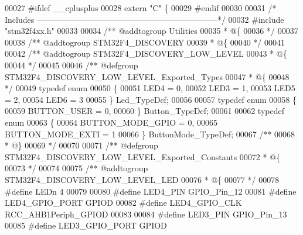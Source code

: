 \begin{DoxyCode}
00027 \textcolor{preprocessor}{#}\textcolor{preprocessor}{ifdef} \_\_cplusplus
00028  \textcolor{keyword}{extern} \textcolor{stringliteral}{"C"} \{
00029 \textcolor{preprocessor}{#}\textcolor{preprocessor}{endif}
00030 
00031 \textcolor{comment}{/* Includes ------------------------------------------------------------------*/}
00032  \textcolor{preprocessor}{#}\textcolor{preprocessor}{include} "stm32f4xx.h"
00033 
00034 \textcolor{comment}{/** @addtogroup Utilities}
00035 \textcolor{comment}{  * @\{}
00036 \textcolor{comment}{  */}
00037 
00038 \textcolor{comment}{/** @addtogroup STM32F4\_DISCOVERY}
00039 \textcolor{comment}{  * @\{}
00040 \textcolor{comment}{  */}
00041 
00042 \textcolor{comment}{/** @addtogroup STM32F4\_DISCOVERY\_LOW\_LEVEL}
00043 \textcolor{comment}{  * @\{}
00044 \textcolor{comment}{  */}
00045 
00046 \textcolor{comment}{/** @defgroup STM32F4\_DISCOVERY\_LOW\_LEVEL\_Exported\_Types}
00047 \textcolor{comment}{  * @\{}
00048 \textcolor{comment}{  */}
00049 \textcolor{keyword}{typedef} \textcolor{keyword}{enum}
00050 \{
00051   LED4 = 0,
00052   LED3 = 1,
00053   LED5 = 2,
00054   LED6 = 3
00055 \} Led\_TypeDef;
00056 
00057 \textcolor{keyword}{typedef} \textcolor{keyword}{enum}
00058 \{
00059   BUTTON_USER = 0,
00060 \} Button\_TypeDef;
00061 
00062 \textcolor{keyword}{typedef} \textcolor{keyword}{enum}
00063 \{
00064   BUTTON_MODE_GPIO = 0,
00065   BUTTON_MODE_EXTI = 1
00066 \} ButtonMode\_TypeDef;
00067 \textcolor{comment}{/**}
00068 \textcolor{comment}{  * @\}}
00069 \textcolor{comment}{  */}
00070 
00071 \textcolor{comment}{/** @defgroup STM32F4\_DISCOVERY\_LOW\_LEVEL\_Exported\_Constants}
00072 \textcolor{comment}{  * @\{}
00073 \textcolor{comment}{  */}
00074 
00075 \textcolor{comment}{/** @addtogroup STM32F4\_DISCOVERY\_LOW\_LEVEL\_LED}
00076 \textcolor{comment}{  * @\{}
00077 \textcolor{comment}{  */}
00078 \textcolor{preprocessor}{#}\textcolor{preprocessor}{define} \textcolor{preprocessor}{LEDn}                             4
00079 
00080 \textcolor{preprocessor}{#}\textcolor{preprocessor}{define} \textcolor{preprocessor}{LED4\_PIN}                         GPIO_Pin_12
00081 \textcolor{preprocessor}{#}\textcolor{preprocessor}{define} \textcolor{preprocessor}{LED4\_GPIO\_PORT}                   GPIOD
00082 \textcolor{preprocessor}{#}\textcolor{preprocessor}{define} \textcolor{preprocessor}{LED4\_GPIO\_CLK}                    RCC_AHB1Periph_GPIOD
00083 
00084 \textcolor{preprocessor}{#}\textcolor{preprocessor}{define} \textcolor{preprocessor}{LED3\_PIN}                         GPIO_Pin_13
00085 \textcolor{preprocessor}{#}\textcolor{preprocessor}{define} \textcolor{preprocessor}{LED3\_GPIO\_PORT}                   GPIOD

\end{DoxyCode}
